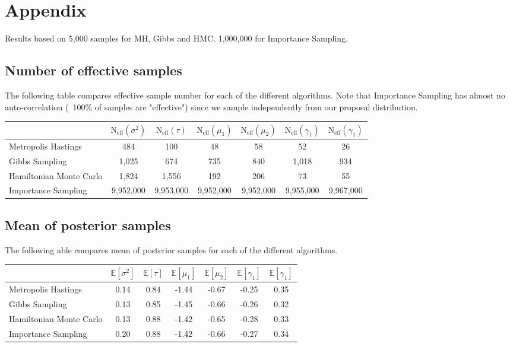 \documentclass[12pt,letterpaper,twoside]{article}
\begin{document}
\newpage
\section{Appendix}
Results based on 5,000 samples for MH, Gibbs and HMC. 1,000,000 for Importance Sampling.
\subsection{Number of effective samples}
The following table compares effective sample number for each of the different algorithms. 
Note that Importance Sampling has almost no auto-correlation (~100\% of samples are "effective") 
since we sample independently from our proposal distribution. 
\begin{table}[H]
    \begin{tabular}{lcccccc}
    \hline
    \multicolumn{1}{c}{}         & $\text{N}_{\text{eff}}(\sigma^2)$ & $\text{N}_{\text{eff}}(\tau)$   & $\text{N}_{\text{eff}}(\mu_1)$   & $\text{N}_{\text{eff}}(\mu_2)$   & $\text{N}_{\text{eff}}(\gamma_1)$  & $\text{N}_{\text{eff}}(\gamma_1)$  \\
    \hline
    Metropolis Hastings          & 484   & 100   & 48    & 58    & 52    & 26    \\
    Gibbs Sampling               & 1,025 & 674   & 735   & 840   & 1,018 & 934   \\
    Hamiltonian Monte Carlo      & 1,824 & 1,556 & 192   & 206   & 73    & 55    \\  
    Importance Sampling          & 9,952,000 & 9,953,000 & 9,952,000 & 9,952,000 & 9,955,000 & 9,967,000  \\
    \hline
    \end{tabular}
\end{table}

\subsection{Mean of posterior samples}
The following able compares mean of posterior samples for each of the different algorithms.
\begin{table}[H]
    \begin{tabular}{lcccccc}
    \hline
    \multicolumn{1}{c}{}         & $\mathbb{E}[\sigma^2]$ \quad & $\mathbb{E}[\tau]$ \quad   & $\mathbb{E}[\mu_1]$  \quad  & $\mathbb{E}[\mu_2]$  \quad  & $\mathbb{E}[\gamma_1]$ \quad  & $\mathbb{E}[\gamma_1]$  \\
    \hline
    Metropolis Hastings          & 0.14  & 0.84  & -1.44 & -0.67 & -0.25 & 0.35  \\
    Gibbs Sampling               & 0.13  & 0.85  & -1.45 & -0.66 & -0.26 & 0.32  \\
    Hamiltonian Monte Carlo      & 0.13  & 0.88  & -1.42 & -0.65 & -0.28 & 0.33  \\  
    Importance Sampling          & 0.20  & 0.88  & -1.42 & -0.66 & -0.27 & 0.34  \\
    \hline
    \end{tabular}
\end{table}
\end{document}
